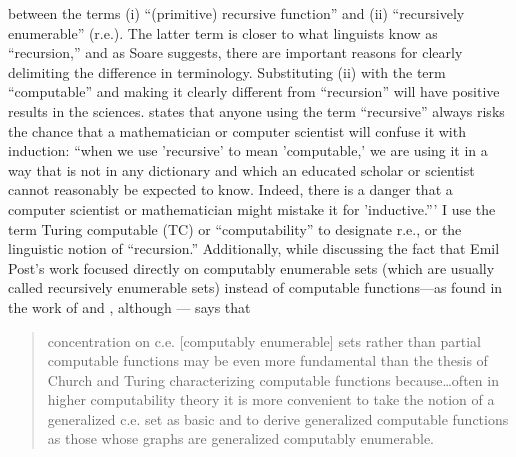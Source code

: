\documentclass[11pt,twoside]{article}
\begin{document}
between the terms (i) ``(primitive) recursive function'' and (ii) ``recursively enumerable'' (r.e.). The latter term is closer to what linguists know as ``recursion,'' and as Soare suggests, there are important reasons for clearly delimiting  the difference in terminology. Substituting (ii) with the term ``computable'' and making it clearly different from ``recursion'' will have positive results in the sciences. \cite[34]{soare:1996} states that anyone using the term ``recursive'' always risks the chance that a mathematician or computer scientist will confuse it with induction: ``when we use 'recursive' to mean 'computable,' we are using it in a way that is not in any dictionary and which an educated scholar or scientist cannot reasonably be expected to know. Indeed, there is a danger that a computer scientist or mathematician might mistake it for 'inductive.''' I use the term Turing computable (TC) or ``computability'' to designate r.e., or the linguistic notion of ``recursion.'' Additionally, while discussing the fact that Emil Post's work focused directly on computably enumerable sets (which are usually called recursively enumerable sets) instead of computable functions---as found in the work of \cite{church:1936} and \cite{turing:1936}, although \cite{post:1936}---\cite[25]{soare:2008} says that
   
\begin{quotation}
concentration on c.e. [computably enumerable] sets rather than partial computable 	functions may be even more fundamental than the thesis of Church and Turing 	characterizing computable functions because\ldots often in higher computability theory it is more convenient to take the notion of a 	generalized c.e. set as basic and to derive generalized computable functions as 	those whose graphs are generalized computably enumerable.
\end{quotation} 
\end{document}
